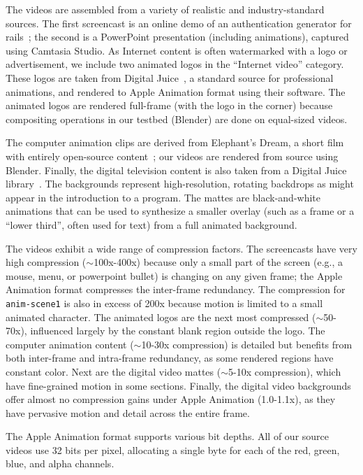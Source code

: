 The videos are assembled from a variety of realistic and
industry-standard sources.  The first screencast is an online demo of
an authentication generator for rails~\cite{auth-demo}; the second is
a PowerPoint presentation (including animations), captured using
Camtasia Studio.  As Internet content is often watermarked with a logo
or advertisement, we include two animated logos in the ``Internet
video'' category.  These logos are taken from Digital
Juice~\cite{digital-juice}, a standard source for professional
animations, and rendered to Apple Animation format using their
software.  The animated logos are rendered full-frame (with the logo
in the corner) because compositing operations in our testbed (Blender)
are done on equal-sized videos.

The computer animation clips are derived from Elephant's Dream, a
short film with entirely open-source content~\cite{elephants-dream};
our videos are rendered from source using Blender.  Finally, the
digital television content is also taken from a Digital Juice
library~\cite{digital-juice}.  The backgrounds represent
high-resolution, rotating backdrops as might appear in the
introduction to a program.  The mattes are black-and-white animations
that can be used to synthesize a smaller overlay (such as a frame or a
``lower third'', often used for text) from a full animated background.

The videos exhibit a wide range of compression factors.  The
screencasts have very high compression ($\sim$100x-400x) because only
a small part of the screen (e.g., a mouse, menu, or powerpoint bullet)
is changing on any given frame; the Apple Animation format compresses
the inter-frame redundancy.  The compression for {\tt anim-scene1} is
also in excess of 200x because motion is limited to a small animated
character.  The animated logos are the next most compressed
($\sim$50-70x), influenced largely by the constant blank region
outside the logo.  The computer animation content ($\sim$10-30x
compression) is detailed but benefits from both inter-frame and
intra-frame redundancy, as some rendered regions have constant color.
Next are the digital video mattes ($\sim$5-10x compression), which
have fine-grained motion in some sections.  Finally, the digital video
backgrounds offer almost no compression gains under Apple Animation
(1.0-1.1x), as they have pervasive motion and detail across the entire
frame.

The Apple Animation format supports various bit depths.  All of our
source videos use 32 bits per pixel, allocating a single byte for each
of the red, green, blue, and alpha channels.

